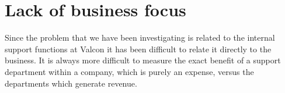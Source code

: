 \section{Lack of business focus}
Since the problem that we have been investigating is related to the internal support functions at Valcon it has been difficult to relate it directly to the business.
It is always more difficult to measure the exact benefit of a support department within a company, which is purely an expense, versus the departments which generate revenue.
